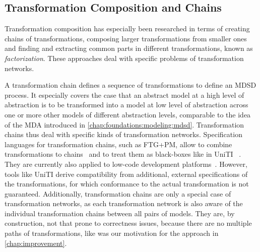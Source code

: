\subsection{Transformation Composition and Chains}

Transformation composition has especially been researched in terms of creating chains of transformations, composing larger transformations from smaller ones and finding and extracting common parts in different transformations, known as \emph{factorization}.
These approaches deal with specific problems of transformation networks.

A transformation chain defines a sequence of transformations to define an \gls{MDSD} process.
It especially covers the case that an abstract model at a high level of abstraction is to be transformed into a model at low level of abstraction across one or more other models of different abstraction levels, comparable to the idea of the \gls{MDA} introduced in \autoref{chap:foundations:modeling:mdsd}.
Transformation chains thus deal with specific kinds of transformation networks.
Specification languages for transformation chains, such as FTG+PM,
allow to combine transformations to chains~\cite{lucio2013FTGPM-SDL} and to treat them as black-boxes like in UniTI
~\cite{vanhooff2006a, vanhooff2007UniTI-MODELS, pilgrim2008constructingChains-ECMDA}.
They are currently also applied to low-code development platforms~\cite{sahay2020TransformationCompositionLowCode-Models}.
However, tools like UniTI derive compatibility from additional, external specifications of the transformations, for which conformance to the actual transformation is not guaranteed.
Additionally, transformation chains are only a special case of transformation networks, as each transformation network is also aware of the individual transformation chains between all pairs of models.
They are, by construction, not that prone to correctness issues, because there are no multiple paths of transformations, like was our motivation for the \commonalities approach in \autoref{chap:improvement}.


